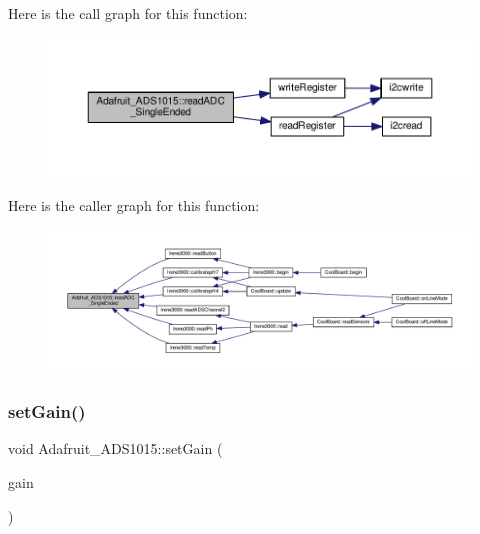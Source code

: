 Here is the call graph for this function\+:
\nopagebreak
\begin{figure}[H]
\begin{center}
\leavevmode
\includegraphics[width=350pt]{class_adafruit___a_d_s1015_a40f38b9e1f3ec397c0670dd632510235_cgraph}
\end{center}
\end{figure}
Here is the caller graph for this function\+:
\nopagebreak
\begin{figure}[H]
\begin{center}
\leavevmode
\includegraphics[width=350pt]{class_adafruit___a_d_s1015_a40f38b9e1f3ec397c0670dd632510235_icgraph}
\end{center}
\end{figure}
\mbox{\label{class_adafruit___a_d_s1015_a399441eace686975ff22937cbe45cc50}} 
\subsubsection{\texorpdfstring{set\+Gain()}{setGain()}}
{\footnotesize\ttfamily void Adafruit\+\_\+\+A\+D\+S1015\+::set\+Gain (\begin{DoxyParamCaption}\item[{\hyperlink{_cool_adafruit___a_d_s1015_8h_a3d6c0e15829a207b9155890811fa4781}{ads\+Gain\+\_\+t}}]{gain }\end{DoxyParamCaption})}



